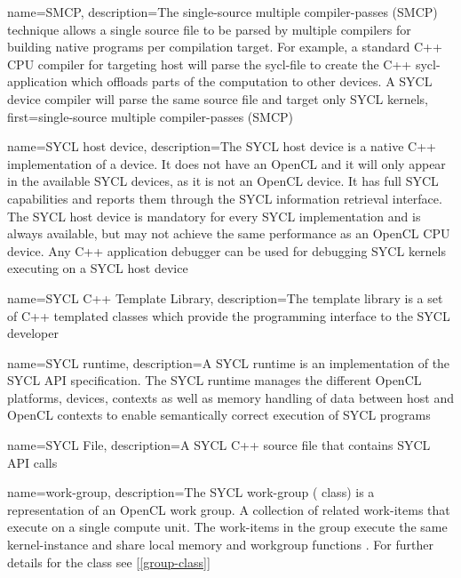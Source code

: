 {
  name={SMCP},
  description={The single-source multiple compiler-passes (SMCP) technique allows
         a single source file to be parsed by multiple compilers for
         building native programs per compilation target.
         For example, a standard C++ CPU compiler
               for targeting \gls{host} will parse the  \gls{sycl-file} to create the
               C++ \gls{sycl-application} which offloads parts of the computation to
               other \glspl{device}. A SYCL device compiler will parse the same
               source file and target only SYCL kernels},
  first={single-source multiple compiler-passes (SMCP)}
}

{
  name={SYCL host device},
  description={The SYCL host device is a native C++
               implementation of a \gls{device}. It does not have an OpenCL
                and it will only appear in the 
               available SYCL devices, as it is not an OpenCL device. It has
               full SYCL capabilities and reports them through the SYCL 
               information retrieval interface. The SYCL host device is 
               mandatory for every SYCL implementation and is always available,
               but may not achieve the same performance as an OpenCL CPU device.
               Any C++ application debugger can be used for debugging SYCL
               kernels executing on a SYCL host device}
}

{
  name={SYCL C++ Template Library},
  description={The template library is a set of C++ templated classes which provide
               the programming interface to the SYCL developer}
}

{
  name={SYCL runtime},
  description={A SYCL runtime is an implementation of the SYCL API
               specification. The SYCL runtime manages the different OpenCL
               platforms, \glspl{device}, contexts as well as memory handling of data
               between host and OpenCL contexts to enable semantically
               correct execution of SYCL programs}
}

{
  name={SYCL File},
  description={A SYCL C++ source file that contains SYCL API calls}
}

{
  name={work-group},
  description={The SYCL work-group ( class) is a
               representation of an OpenCL work group. A collection of related
               work-items that execute on a single compute unit. The
               work-items in the group execute the same kernel-instance and
               share local memory and workgroup functions \cite{opencl12}. For
               further details for the  class see
               [\ref{group-class}]}
}

